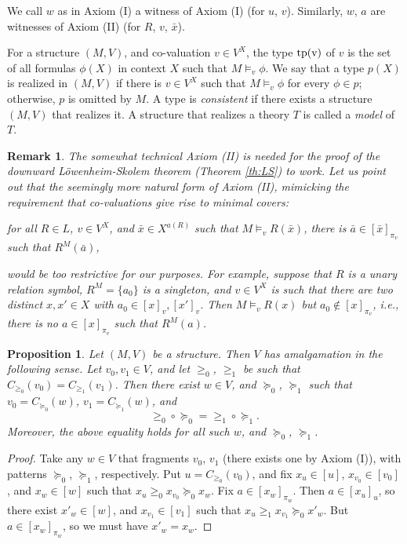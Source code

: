 \documentclass[12pt]{amsart}
\theoremstyle{plain}
\newtheorem{remark}[theorem]{\bf Remark}
\newtheorem{proposition}[theorem]{\bf Proposition}
\newcommand \tp{\rm{tp}}
\begin{document}
We call $w$ as in Axiom (I) a witness of Axiom (I) (for $u$, $v$). Similarly, $w$, $a$ are witnesses of Axiom (II) (for $R$, $v$, $\bar{x}$).

For a structure $(M,V)$, and co-valuation $v \in V^X$, the type $\tp(v)$ of $v$ is the set of all formulas $\phi(X)$ in context $X$ such that  $M \models_v \phi$. We say that a type $p(X)$ is realized in $(M,V)$ if there is $v \in V^X$ such that $M \vDash_v \phi$ for every $\phi \in p$; otherwise, $p$ is omitted by $M$.  A type is \emph{consistent} if there exists a structure $(M,V)$ that realizes it.  A structure that realizes a theory $T$ is called a \emph{model} of $T$.

\begin{remark}
The somewhat technical Axiom (II) is needed for the proof of the downward L\" owenheim-Skolem theorem (Theorem \ref{th:LS}) to work. Let us point out that the seemingly more natural form of Axiom (II), mimicking the requirement that co-valuations give rise to minimal covers: 

\medskip
for all $R \in L$, $v \in V^X$, and $\bar{x} \in X^{a(R)}$ such that $M \vDash_v R(\bar{x})$, there is $\bar{a} \in [\bar{x}]_{\pi_{v}}$ such that $R^M(\bar{a})$, 
\medskip

would be too restrictive for our purposes. For example, suppose that $R$ is a unary relation symbol, $R^M=\{a_0\}$ is a singleton, and $v \in V^X$ is such that there are two distinct $x,x' \in X$ with $a_0 \in [x]_v,[x']_v$.  Then $M \models_v R(x)$ but $a_0 \not \in [x]_{\pi_v}$, i.e., there is no $a \in [x]_{\pi_v}$ such that $R^M(a)$.  
\end{remark}
	
\begin{proposition}
\label{pr:Amalgamation}
Let $(M,V)$ be a structure. Then $V$ has amalgamation in the following sense. Let $v_0,v_1 \in V$, and let $\geq_0$, $\geq_1$ be such that $C_ {\geq_0} (v_0)=C_{ \geq_1} (v_1)$. Then there exist $w \in V$,  and $\succeq_0$, $\succeq_1$ such that $v_0=C_{ \succeq_0} (w)$, $v_1 =C_{\succeq_1} (w)$, and $$\geq_0 \circ \succeq_0=\geq_1 \circ \succeq_1.$$ Moreover, the above equality holds for all such $w$, and $\succeq_0$, $\succeq_1$.
\end{proposition}

\begin{proof}
Take any $w \in V$ that fragments $v_0$, $v_1$ (there exists one by Axiom (I)), with patterns $\succeq_0$, $\succeq_1$, respectively. Put $u=C_ {\geq_0}(v_0)$, and fix  $x_u \in [u]$, $x_{v_0} \in [v_0]$, and $x _w\in [w]$ such that $x_{u} \geq_0 x_{v_0} \succeq_0 x_w$. Fix $a \in [x_w]_{\pi_w}$. Then $a \in [x_u]_u$, so there exist $x'_w \in [w]$, and $x_{v_1} \in [v_1]$ such that  $x_{u} \geq_1 x_{v_1} \succeq_0 x'_w$. But $a \in [x_w]_{\pi_w}$, so we must have $x'_w=x_w$.
\end{proof}
\end{document}
